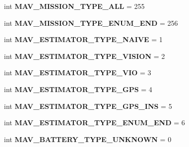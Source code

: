 \begin{DoxyCompactItemize}
int {\bfseries M\+A\+V\+\_\+\+M\+I\+S\+S\+I\+O\+N\+\_\+\+T\+Y\+P\+E\+\_\+\+A\+LL} = 255
\item 
\mbox{\label{namespacepymavlink_1_1dialects_1_1v10_a79c563ad00d62009bdc8e206c28a3917}} 
int {\bfseries M\+A\+V\+\_\+\+M\+I\+S\+S\+I\+O\+N\+\_\+\+T\+Y\+P\+E\+\_\+\+E\+N\+U\+M\+\_\+\+E\+ND} = 256
\item 
\mbox{\label{namespacepymavlink_1_1dialects_1_1v10_a3d5329c49a5ae191fa98ed86784a834d}} 
int {\bfseries M\+A\+V\+\_\+\+E\+S\+T\+I\+M\+A\+T\+O\+R\+\_\+\+T\+Y\+P\+E\+\_\+\+N\+A\+I\+VE} = 1
\item 
\mbox{\label{namespacepymavlink_1_1dialects_1_1v10_aa69736efe88129a2c3f26b4142da0c26}} 
int {\bfseries M\+A\+V\+\_\+\+E\+S\+T\+I\+M\+A\+T\+O\+R\+\_\+\+T\+Y\+P\+E\+\_\+\+V\+I\+S\+I\+ON} = 2
\item 
\mbox{\label{namespacepymavlink_1_1dialects_1_1v10_a50cf9dfe55a3b33d668e1e1a8f6f3739}} 
int {\bfseries M\+A\+V\+\_\+\+E\+S\+T\+I\+M\+A\+T\+O\+R\+\_\+\+T\+Y\+P\+E\+\_\+\+V\+IO} = 3
\item 
\mbox{\label{namespacepymavlink_1_1dialects_1_1v10_ae9a2fc005d88b731aed66141d76fa1c7}} 
int {\bfseries M\+A\+V\+\_\+\+E\+S\+T\+I\+M\+A\+T\+O\+R\+\_\+\+T\+Y\+P\+E\+\_\+\+G\+PS} = 4
\item 
\mbox{\label{namespacepymavlink_1_1dialects_1_1v10_a126d13be5cc26b343eb5d15c9a6e48b6}} 
int {\bfseries M\+A\+V\+\_\+\+E\+S\+T\+I\+M\+A\+T\+O\+R\+\_\+\+T\+Y\+P\+E\+\_\+\+G\+P\+S\+\_\+\+I\+NS} = 5
\item 
\mbox{\label{namespacepymavlink_1_1dialects_1_1v10_a10a9677ac8c8c45eae234acc9af65633}} 
int {\bfseries M\+A\+V\+\_\+\+E\+S\+T\+I\+M\+A\+T\+O\+R\+\_\+\+T\+Y\+P\+E\+\_\+\+E\+N\+U\+M\+\_\+\+E\+ND} = 6
\item 
\mbox{\label{namespacepymavlink_1_1dialects_1_1v10_add13c3248b9500afb9df3ff274fd6ddf}} 
int {\bfseries M\+A\+V\+\_\+\+B\+A\+T\+T\+E\+R\+Y\+\_\+\+T\+Y\+P\+E\+\_\+\+U\+N\+K\+N\+O\+WN} = 0

\end{DoxyCompactItemize}
